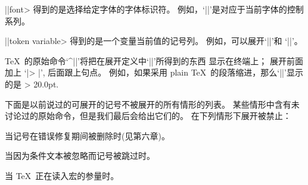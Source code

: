 {{{{{{{{%
\textindent\bull |\the|\<font> 得到的是选择给定字体的字体标识符。%
例如，`|\the\font|'是对应于当前字体的控制系列。

\goodbreak\smallskip
\textindent\bull |\the|\<token variable> \1得到的是一个变量当前值的记号列。%
例如，可以展开`|\the\everypar|'和 `|\the{}|'。

\ddanger  \TeX\ 的原始命令`^|\showthe|'将把在展开定义中`|\the|'所得到的东西%
显示在终端上；
展开前面加上 `|> |', 后面跟上句点。%
例如，如果采用 plain \TeX\ 的段落缩进，那么`|\showthe\parindent|'显示的是
\begintt
> 20.0pt.
\endtt

\ddanger 下面是以前说过的可展开的记号不被展开的所有情形的列表。%
某些情形中含有未讨论过的原始命令，但是我们最后会给出它们的。%
在下列情形下展开被禁止：
\enddanger

\nobreak\medskip
\item\bull 当记号在错误修复期间被删除时(见第六章)。

\smallskip
\item\bull 当因为条件文本被忽略而记号被跳过时。

\smallskip
\item\bull 当 \TeX\ 正在读入宏的参量时。

}}}}}}}}
